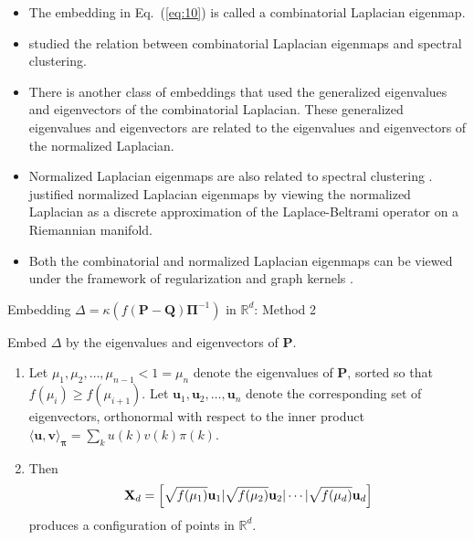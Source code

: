 \documentclass[professionalfonts, hyperref={pdfpagelabels=false,
  colorlinks=true, linkcolor=purple}]{beamer}
\begin{document}
\begin{frame}
  \begin{itemize}
  \item The embedding in Eq.~(\ref{eq:10}) is called a \alert{combinatorial}
    Laplacian eigenmap.
  \item \cite{saerens04} studied the relation between
    combinatorial Laplacian eigenmaps and spectral clustering.
  \item There is another class of embeddings that used the
    \alert{generalized} eigenvalues and eigenvectors of the
    combinatorial Laplacian. These generalized eigenvalues and
    eigenvectors are related to the eigenvalues and eigenvectors of
    the \alert{normalized} Laplacian.
  \item Normalized Laplacian eigenmaps are also related to spectral
    clustering \cite{shi97:_normal}. \cite{belkin03:_laplac} justified
    normalized Laplacian eigenmaps by viewing the normalized Laplacian
    as a discrete approximation of the Laplace-Beltrami operator on a
    Riemannian manifold.
  \item Both the combinatorial and normalized Laplacian eigenmaps can
    be viewed under the framework of regularization and graph
    kernels \cite{smola03:_kernel}.
  \end{itemize}
\end{frame}

\begin{frame}{Embedding $\Delta = \kappa(f(\mathbf{P} -
    \mathbf{Q})\bm{\Pi}^{-1})$ in $\mathbb{R}^{d}$: Method 2}

 Embed $\Delta$ by the eigenvalues and eigenvectors of $\mathbf{P}$. 
 \vskip10pt
  \begin{enumerate}
  \item Let $\mu_1, \mu_2, \dots, \mu_{n-1} < 1 = \mu_n$ denote the
    eigenvalues of $\mathbf{P}$, sorted so that $f(\mu_{i}) \geq
    f(\mu_{i+1})$. Let $\bm{u}_1, \bm{u}_2, \dots, \bm{u}_{n}$ denote
    the corresponding set of eigenvectors, orthonormal with respect to
    the inner product $\langle \bm{u}, \bm{v} \rangle_{\bm{\pi}} =
    \sum_{k}{u(k) v(k) \pi(k)}$.
  \item \vskip10pt Then
    \begin{equation*}
      \mathbf{X}_d = \Bigl[ \sqrt{f(\mu_1)} \mathbf{u}_1 |
      \sqrt{f(\mu_2)} \mathbf{u}_{2} | \cdots |
      \sqrt{f(\mu_d)} \mathbf{u}_d \Bigr]
    \end{equation*}
    produces a configuration of points in $\mathbb{R}^{d}$.
  \end{enumerate}
\end{frame}
\end{document}
